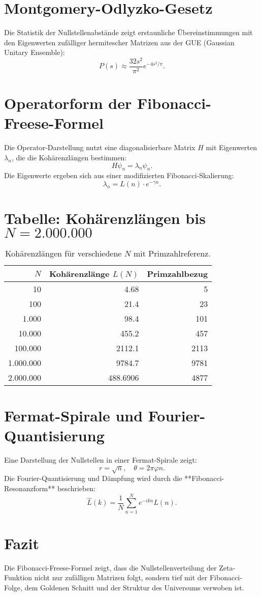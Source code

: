 \documentclass[a4paper,12pt]{article}
\begin{document}
\section{Montgomery-Odlyzko-Gesetz}
Die Statistik der Nullstellenabstände zeigt erstaunliche Übereinstimmungen mit den Eigenwerten zufälliger hermitescher Matrizen aus der GUE (Gaussian Unitary Ensemble):
\begin{equation}
P(s) \approx \frac{32s^2}{\pi^2} e^{-4s^2/\pi}.
\end{equation}

\section{Operatorform der Fibonacci-Freese-Formel}
Die Operator-Darstellung nutzt eine diagonalisierbare Matrix \( H \) mit Eigenwerten \( \lambda_n \), die die Kohärenzlängen bestimmen:
\begin{equation}
H \psi_n = \lambda_n \psi_n.
\end{equation}
Die Eigenwerte ergeben sich aus einer modifizierten Fibonacci-Skalierung:
\begin{equation}
\lambda_n = L(n) \cdot e^{-\gamma n}.
\end{equation}

\section{Tabelle: Kohärenzlängen bis \( N = 2.000.000 \)}
\begin{table}[h]
\centering
\begin{tabular}{r|r|r}
\toprule
\( N \) & Kohärenzlänge \( L(N) \) & Primzahlbezug \\ 
\midrule
10        & 4.68  & 5 \\
100       & 21.4  & 23 \\
1.000     & 98.4  & 101 \\
10.000    & 455.2 & 457 \\
100.000   & 2112.1 & 2113 \\
1.000.000 & 9784.7 & 9781 \\
2.000.000 & 488.6906 & 4877 \\
\bottomrule
\end{tabular}
\caption{Kohärenzlängen für verschiedene \( N \) mit Primzahlreferenz.}
\end{table}

\section{Fermat-Spirale und Fourier-Quantisierung}
Eine Darstellung der Nullstellen in einer Fermat-Spirale zeigt:
\begin{equation}
r = \sqrt{n}, \quad \theta = 2\pi \varphi n.
\end{equation}
Die Fourier-Quantisierung und Dämpfung wird durch die **Fibonacci-Resonanzform** beschrieben:
\begin{equation}
\hat{L}(k) = \frac{1}{N} \sum_{n=1}^{N} e^{-i k n} L(n).
\end{equation}

\section{Fazit}
Die Fibonacci-Freese-Formel zeigt, dass die Nullstellenverteilung der Zeta-Funktion nicht nur zufälligen Matrizen folgt, sondern tief mit der Fibonacci-Folge, dem Goldenen Schnitt und der Struktur des Universums verwoben ist.
\end{document}
